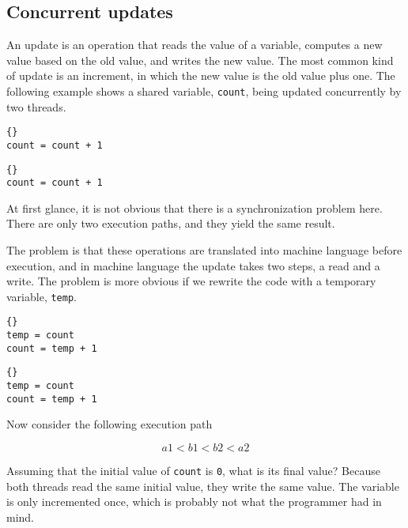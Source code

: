 \documentclass{book}
\begin{document}
\subsection {Concurrent updates}

An update is an operation that reads the value of a variable, computes
a new value based on the old value, and writes the new value.
The most common kind of update is an increment, in which the
new value is the old value plus one.  The following example
shows a shared variable, {\tt count}, being updated concurrently
by two threads.

\begin{minipage}[t]{2in}
\begin{lstlisting}[title={Thread A}]{}
count = count + 1
\end{lstlisting}
\end{minipage}
\hfill
\begin{minipage}[t]{2in}
\begin{lstlisting}[title={Thread B}]{}
count = count + 1
\end{lstlisting}
\end{minipage}

At first glance, it is not obvious that there is a synchronization
problem here.  There are only two execution paths, and they
yield the same result.

The problem is that these operations are translated into
machine language before execution, and in machine language
the update takes two steps, a read and a write.
The problem is more obvious if we rewrite the code with a temporary
variable, {\tt temp}.

\begin{minipage}[t]{2in}
\begin{lstlisting}[title={Thread A}]{}
temp = count
count = temp + 1
\end{lstlisting}
\end{minipage}
\hfill
\begin{minipage}[t]{2in}
\begin{lstlisting}[title={Thread B}]{}
temp = count
count = temp + 1
\end{lstlisting}
\end{minipage}

Now consider the following execution path 

\[  a1 < b1 < b2 < a2  \]

Assuming that the
initial value of {\tt count} is {\tt 0},
what is its final value?  Because
both threads read the same initial value, they write
the same value.  The variable is only incremented once, which
is probably not what the programmer had in mind.
\end{document}
